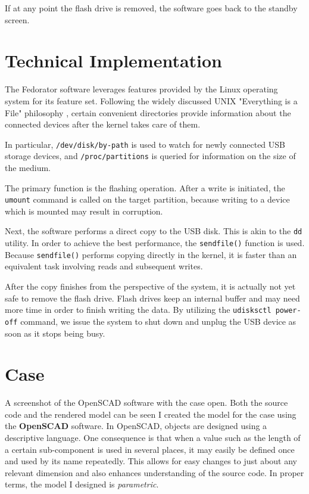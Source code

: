             If at any point the flash drive is removed, the software goes back to the standby screen.
            
        \section{Technical Implementation}
            The Fedorator software leverages features provided by the Linux operating system for its feature set.  Following the widely discussed UNIX "Everything is a File" philosophy \cite{ph7spot-unix-file}, certain convenient directories provide information about the connected devices after the kernel takes care of them.
            
            In particular, \texttt{/dev/disk/by-path} is used to watch for newly connected USB storage devices, and \texttt{/proc/partitions} is queried for information on the size of the medium.
            
            The primary function is the flashing operation.  After a write is initiated, the \texttt{umount} command is called on the target partition, because writing to a device which is mounted may result in corruption.
            
             Next, the software performs a direct copy to the USB disk.  This is akin to the \texttt{dd} utility.  In order to achieve the best performance, the \texttt{sendfile()} \cite{man-sendfile} function is used.  Because \texttt{sendfile()} performs copying directly in the kernel, it is faster than an equivalent task involving reads and subsequent writes.
            
            After the copy finishes from the perspective of the system, it is actually not yet safe to remove the flash drive.  Flash drives keep an internal buffer and may need more time in order to finish writing the data.  By utilizing the \texttt{udisksctl power-off} command, we issue the system to shut down and unplug the USB device as soon as it stops being busy.
            
    \section{Case}
            {A screenshot of the OpenSCAD software with the case open.  Both the source code and the rendered model can be seen}
        I created the model for the case using the \textbf{OpenSCAD} software.  In OpenSCAD, objects are designed using a descriptive language.  One consequence is that when a value such as the length of a certain sub-component is used in several places, it may easily be defined once and used by its name repeatedly.  This allows for easy changes to just about any relevant dimension and also enhances understanding of the source code.  In proper terms, the model I designed is \textit{parametric}.
        
